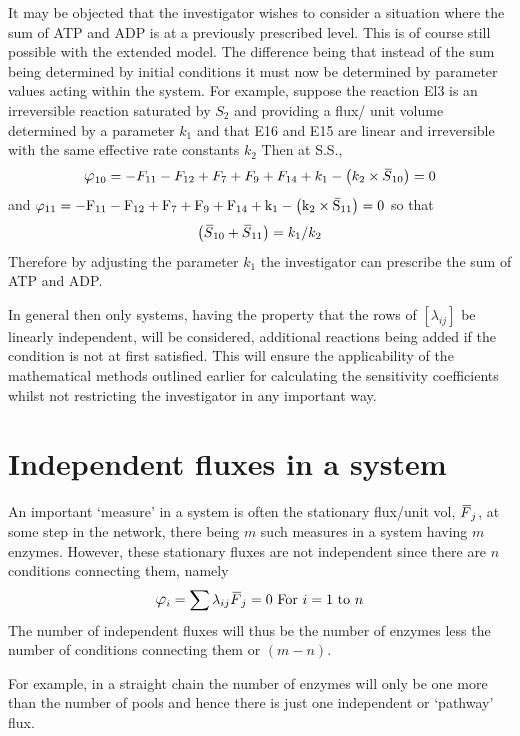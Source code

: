 It may be objected that the investigator wishes to consider a situation where the sum of ATP and ADP is at a previously prescribed level. This is of course still possible with the extended model. The difference being that instead of the sum being determined by initial conditions it must now be determined by parameter values acting within the system. For example, suppose the reaction El3 is an irreversible reaction saturated by $S_{2}$ and providing a flux/ unit volume determined by a parameter $k_{1}$ and that E16 and E15 are linear and irreversible with the same effective rate constants $k_{2}$ Then at S.S.,
%
$$
\varphi_{10}=-F_{11}-F_{12}+F_{7}+F_{9}+F_{14}+k_{1}-\left(k_{2} \times \olsi{S}_{10}\right) = 0
$$
%
and $\varphi_{11} = -\mathrm{F}_{11}-\mathrm{F}_{12}+\mathrm{F}_{7}+\mathrm{F}_{9}+\mathrm{F}_{14}+\mathrm{k}_{1}-\left(\mathrm{k}_{2} \times \olsi{\mathrm{S}}_{11}\right)=0$ so that
%
$$
\left(\,\overline{\!{S}}_{10} + \,\overline{\!{S}}_{11}\right) = k_{1}/k_{2}
$$
%
Therefore by adjusting the parameter $k_{1}$ the investigator can prescribe the sum of ATP and ADP.

In general then only systems, having the property that the rows of $\left[\lambda_{ij}\right]$ be linearly independent, will be considered, additional reactions being added if the condition is not at first satisfied. This will ensure the applicability of the mathematical methods outlined earlier for calculating the sensitivity coefficients whilst not restricting the investigator in any important way.

\section{Independent fluxes in a system}

An important `measure' in a system is often the stationary flux/unit vol, $\,\overline{\!{F}}_{j}$, at some step in the network, there being $m$ such measures in a system having $m$ enzymes. However, these stationary fluxes are not independent since there are $n$ conditions connecting them, namely
%
\begin{equation}
\varphi_{i}=\sum \lambda_{i j} \olsi{F}_{j}=0 \mbox{ For } i=1 \mbox{ to } n
\label{eqn:24}
\end{equation}
%
The number of independent fluxes will thus be the number of enzymes less the number of conditions connecting them or $(m-n)$.

For example, in a straight chain the number of enzymes will only be one more than the number of pools and hence there is just one independent or `pathway' flux.

